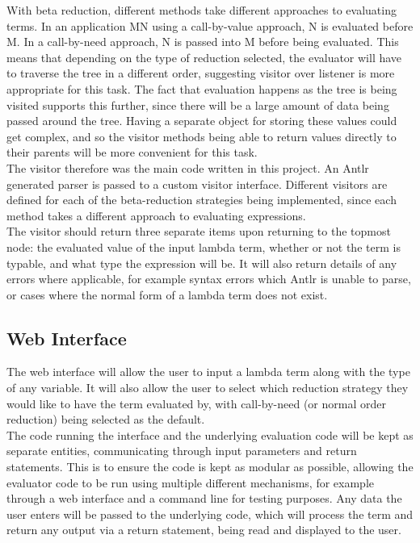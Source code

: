 \documentclass[a4paper,12pt]{report}
\begin{document}
With beta reduction, different methods take different approaches to evaluating terms. In an application MN using a call-by-value approach, N is evaluated before M. In a call-by-need approach, N is passed into M before being evaluated. This means that depending on the type of reduction selected, the evaluator will have to traverse the tree in a different order, suggesting visitor over listener is more appropriate for this task. The fact that evaluation happens as the tree is being visited supports this further, since there will be a large amount of data being passed around the tree. Having a separate object for storing these values could get complex, and so the visitor methods being able to return values directly to their parents will be more convenient for this task.\\

The visitor therefore was the main code written in this project. An Antlr generated parser is passed to a custom visitor interface. Different visitors are defined for each of the beta-reduction strategies being implemented, since each method takes a different approach to evaluating expressions.\\

The visitor should return three separate items upon returning to the topmost node: the evaluated value of the input lambda term, whether or not the term is typable, and what type the expression will be. It will also return details of any errors where applicable, for example syntax errors which Antlr is unable to parse, or cases where the normal form of a lambda term does not exist.

\subsection{Web Interface}

The web interface will allow the user to input a lambda term along with the type of any variable. It will also allow the user to select which reduction strategy they would like to have the term evaluated by, with call-by-need (or normal order reduction) being selected as the default.\\

The code running the interface and the underlying evaluation code will be kept as separate entities, communicating through input parameters and return statements. This is to ensure the code is kept as modular as possible, allowing the evaluator code to be run using multiple different mechanisms, for example through a web interface and a command line for testing purposes. Any data the user enters will be passed to the underlying code, which will process the term and return any output via a return statement, being read and displayed to the user.\\
\end{document}
